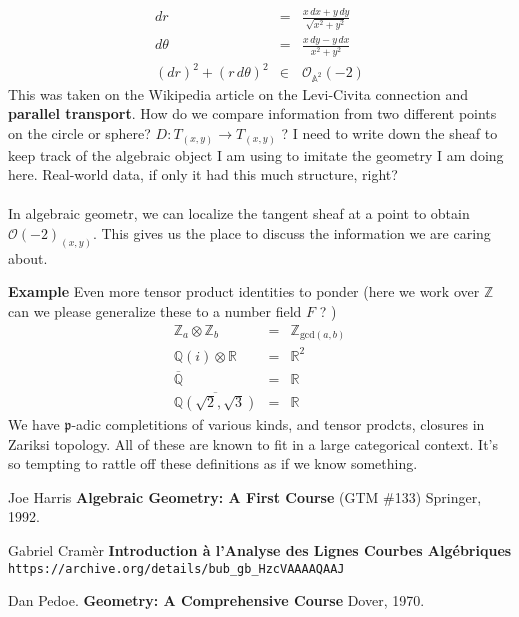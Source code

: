 \documentclass[12pt]{article}
\begin{document}
\begin{eqnarray}
dr &=& \frac{x \, dx + y \, dy}{\sqrt{x^2 + y^2}} \\
d\theta &=& \frac{x \, dy - y \, dx}{x^2 + y^2} \\ 
(dr)^2 + (r \, d\theta)^2 &\in & \mathcal{O}_{\mathbb{A}^2}(-2) 
\end{eqnarray}
This was taken on the Wikipedia article on the Levi-Civita connection and \textbf{parallel transport}. How do we compare information from two different points on the circle or sphere? $D: T_{(x,y)} \to T_{(x,y)}$ ? I need to write down the sheaf to keep track of the algebraic object I am using to imitate the geometry I am doing here.  Real-world data, if only it had this much structure, right? \\ \\
In  algebraic geometr, we can localize the tangent sheaf at a point to obtain $\mathcal{O}(-2)_{(x,y)}$.  This gives us the place to discuss the information  we are caring about.

\newpage

\noindent \textbf{Example} Even more tensor product identities to ponder (here we work over $\mathbb{Z}$ can we please generalize these to a number field $F$ ? )
\begin{eqnarray*}
\mathbb{Z}_a \otimes \mathbb{Z}_b&=& \mathbb{Z}_{\text{gcd}(a,b)} \\ 
\mathbb{Q}(i) \otimes \mathbb{R} &=& \mathbb{R}^2 \\ 
\overline{\mathbb{Q}} &=& \mathbb{R} \\ 
\overline{\mathbb{Q}(\sqrt{2}, \sqrt{3})} &=& \mathbb{R}
\end{eqnarray*}
We have $\mathfrak{p}$-adic completitions of various kinds, and tensor prodcts, closures in Zariksi topology.  All of these are known to fit in a large categorical context. It's so tempting to rattle off these definitions as if we know something.

\vfill

\begin{thebibliography}{}

\item Joe Harris \textbf{Algebraic Geometry: A First Course} (GTM \#133) Springer, 1992.

\item  Gabriel Cram\`{e}r \textbf{Introduction \`{a} l'Analyse des Lignes Courbes Algébriques} \\ \texttt{https://archive.org/details/bub\_{}gb\_{}HzcVAAAAQAAJ}

\item Dan Pedoe.  \textbf{Geometry: A Comprehensive Course} Dover, 1970.

\end{thebibliography}
\end{document}
